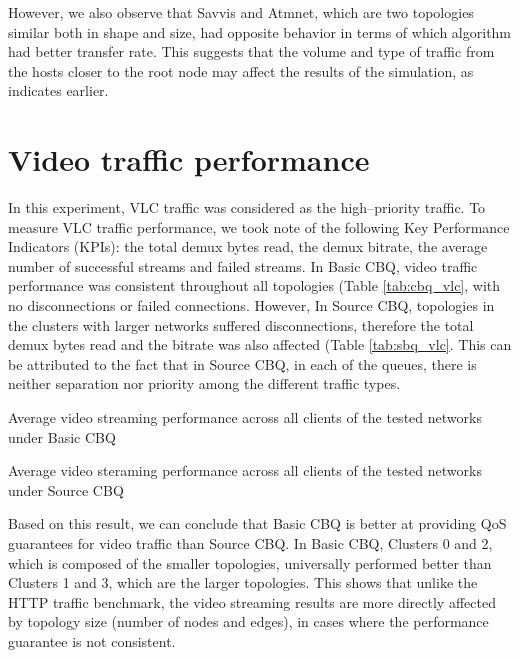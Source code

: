 However, we also observe that Savvis and Atmnet, which are two topologies similar both in shape and size, had opposite behavior in terms of which algorithm had better transfer rate. This suggests that the volume and type of traffic from the hosts closer to the root node may affect the results of the simulation, as indicates earlier.

\section{Video traffic performance}
In this experiment, VLC traffic was considered as the high--priority traffic. To measure VLC traffic performance, we took note of the following Key Performance Indicators (KPIs): the total demux bytes read, the demux bitrate, the average number of successful streams and failed streams. In Basic CBQ, video traffic performance was consistent throughout all topologies (Table \ref{tab:cbq_vlc}, with no disconnections or failed connections. However, In Source CBQ, topologies in the clusters with larger networks suffered disconnections, therefore the total demux bytes read and the bitrate was also affected (Table \ref{tab:sbq_vlc}. This can be attributed to the fact that in Source CBQ, in each of the queues, there is neither separation nor priority among the different traffic types.

\begin{table}[htbp]
    \caption{Average video streaming performance across all clients of the tested networks under Basic CBQ}
    \centering
    
    \label{tab:cbq_vlc}
\end{table}

\begin{table}[htbp]
    \caption{Average video steraming performance across all clients of the tested networks under Source CBQ}
    \centering
    
    \label{tab:sbq_vlc}
\end{table}

Based on this result, we can conclude that Basic CBQ is better at providing QoS guarantees for video traffic than Source CBQ. In Basic CBQ, Clusters 0 and 2, which is composed of the smaller topologies, universally performed better than Clusters 1 and 3, which are the larger topologies. This shows that unlike the HTTP traffic benchmark, the video streaming results are more directly affected by topology size (number of nodes and edges), in cases where the performance guarantee is not consistent.
